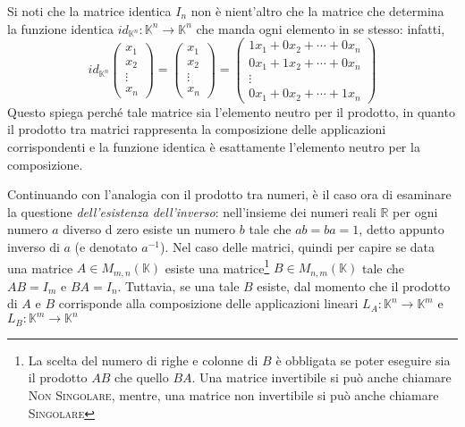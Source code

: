 \begin{oss}
  \label{oss:Compinveeproddimatrici4}
  Si noti che la matrice identica $I_n$ non è nient'altro che la matrice che determina la funzione identica
  $id_{\mathds{K}^n}:\mathds{K}^n\to\mathds{K}^n$ che manda ogni elemento in se stesso: infatti,
  \begin{equation}
    \label{eq:Compinveeproddimatrici7}
    id_{\mathds{K}^n}
    \begin{pmatrix}
      x_1\\
      x_2\\
      \vdots\\
      x_n
    \end{pmatrix}=
    \begin{pmatrix}
      x_1\\
      x_2\\
      \vdots\\
      x_n 
    \end{pmatrix}=
    \begin{pmatrix}
      1x_1+0x_2+\cdots+0x_n\\
      0x_1+1x_2+\cdots+0x_n\\
      \vdots\\
      0x_1+0x_2+\cdots+1x_n
    \end{pmatrix}
  \end{equation}
  Questo spiega perché tale matrice sia l'elemento neutro per il prodotto, in quanto il prodotto tra matrici
  rappresenta la composizione delle applicazioni corrispondenti e la funzione identica è esattamente
  l'elemento neutro per la composizione.
\end{oss}
Continuando con l'analogia con il prodotto tra numeri, è il caso ora di esaminare la questione
\textit{dell'esistenza dell'inverso}: nell'insieme dei numeri reali $\mathds{R}$ per ogni numero $a$ diverso
d zero esiste un numero $b$ tale che $ab=ba=1$, detto appunto inverso di $a$ (e denotato $a^{-1}$).
Nel caso delle matrici, quindi per capire se data una matrice $A\in M_{m,n}(\mathds{K})$ esiste una
matrice\footnote{La scelta del numero di righe e colonne di $B$ è obbligata se poter eseguire sia il
  prodotto $AB$ che quello $BA$. Una matrice invertibile si può anche chiamare \textsc{Non Singolare}, mentre,
  una matrice non invertibile si può anche chiamare \textsc{Singolare}} $B\in M_{n,m}(\mathds{K})$ tale che
$AB=I_m$ e $BA=I_n$. Tuttavia, se una tale $B$ esiste, dal momento che il prodotto di $A$ e $B$ corrisponde alla
composizione delle applicazioni lineari $L_A:\mathds{K}^n\to\mathds{K}^m$ e $L_B:\mathds{K}^m\to\mathds{K}^n$
